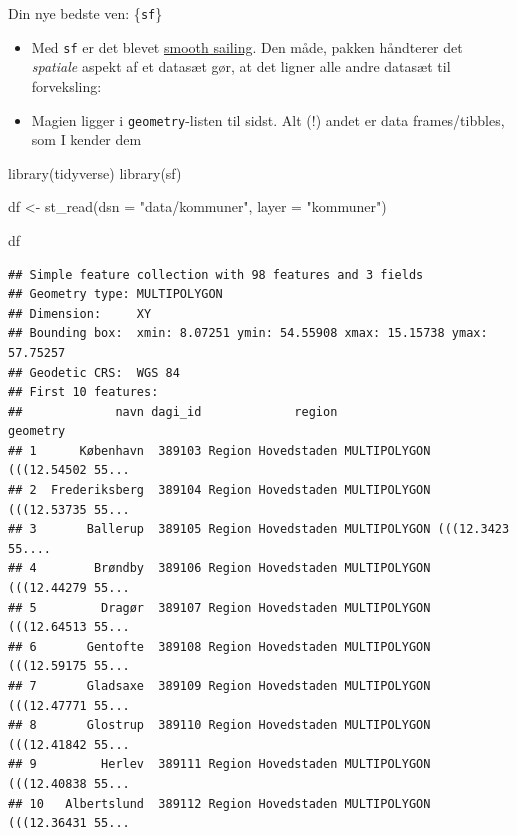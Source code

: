 \documentclass[
  8pt,
  ignorenonframetext,
  aspectratio=169]{beamer}
\newenvironment{Shaded}{}{}
\newcommand{\AttributeTok}[1]{\textcolor[rgb]{0.49,0.56,0.16}{#1}}
\newcommand{\FunctionTok}[1]{\textcolor[rgb]{0.02,0.16,0.49}{#1}}
\newcommand{\NormalTok}[1]{#1}
\newcommand{\OtherTok}[1]{\textcolor[rgb]{0.00,0.44,0.13}{#1}}
\newcommand{\StringTok}[1]{\textcolor[rgb]{0.25,0.44,0.63}{#1}}
\begin{document}
\begin{frame}[fragile]{Din nye bedste ven: \{\texttt{sf}\}}
\protect\hypertarget{din-nye-bedste-ven-sf}{}
\begin{itemize}
\item
  Med \texttt{sf} er det blevet
  \href{https://www.nickbearman.me.uk/2019/04/spatial-r-moving-from-sp-to-sf/}{smooth
  sailing}. Den måde, pakken håndterer det \emph{spatiale} aspekt af et
  datasæt gør, at det ligner alle andre datasæt til forveksling:
\item
  Magien ligger i \texttt{geometry}-listen til sidst. Alt (!) andet er
  data frames/tibbles, som I kender dem
\end{itemize}

\tiny

\begin{Shaded}
\begin{Highlighting}[]
\FunctionTok{library}\NormalTok{(tidyverse)}
\FunctionTok{library}\NormalTok{(sf)}

\NormalTok{df }\OtherTok{\textless{}{-}} \FunctionTok{st\_read}\NormalTok{(}\AttributeTok{dsn =} \StringTok{"data/kommuner"}\NormalTok{,}
              \AttributeTok{layer =} \StringTok{"kommuner"}\NormalTok{)}
\end{Highlighting}
\end{Shaded}

\normalsize

\tiny

\begin{Shaded}
\begin{Highlighting}[]
\NormalTok{df}
\end{Highlighting}
\end{Shaded}

\begin{verbatim}
## Simple feature collection with 98 features and 3 fields
## Geometry type: MULTIPOLYGON
## Dimension:     XY
## Bounding box:  xmin: 8.07251 ymin: 54.55908 xmax: 15.15738 ymax: 57.75257
## Geodetic CRS:  WGS 84
## First 10 features:
##             navn dagi_id             region                       geometry
## 1      København  389103 Region Hovedstaden MULTIPOLYGON (((12.54502 55...
## 2  Frederiksberg  389104 Region Hovedstaden MULTIPOLYGON (((12.53735 55...
## 3       Ballerup  389105 Region Hovedstaden MULTIPOLYGON (((12.3423 55....
## 4        Brøndby  389106 Region Hovedstaden MULTIPOLYGON (((12.44279 55...
## 5         Dragør  389107 Region Hovedstaden MULTIPOLYGON (((12.64513 55...
## 6       Gentofte  389108 Region Hovedstaden MULTIPOLYGON (((12.59175 55...
## 7       Gladsaxe  389109 Region Hovedstaden MULTIPOLYGON (((12.47771 55...
## 8       Glostrup  389110 Region Hovedstaden MULTIPOLYGON (((12.41842 55...
## 9         Herlev  389111 Region Hovedstaden MULTIPOLYGON (((12.40838 55...
## 10   Albertslund  389112 Region Hovedstaden MULTIPOLYGON (((12.36431 55...
\end{verbatim}

\normalsize
\end{frame}
\end{document}
